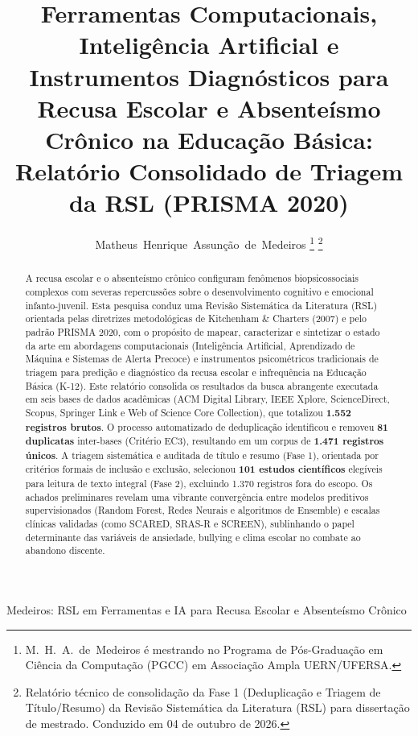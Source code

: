 \documentclass[journal,10pt,a4paper]{IEEEtran}
\begin{document}
\title{Ferramentas Computacionais, Inteligência Artificial e Instrumentos Diagnósticos para Recusa Escolar e Absenteísmo Crônico na Educação Básica: Relatório Consolidado de Triagem da RSL (PRISMA 2020)}

\author{Matheus~Henrique~Assunção~de~Medeiros%
\thanks{M.~H.~A.~de~Medeiros é mestrando no Programa de Pós-Graduação em Ciência da Computação (PGCC) em Associação Ampla UERN/UFERSA.}%
\thanks{Relatório técnico de consolidação da Fase 1 (Deduplicação e Triagem de Título/Resumo) da Revisão Sistemática da Literatura (RSL) para dissertação de mestrado. Conduzido em 04 de outubro de 2026.}
}

%
{Medeiros: RSL em Ferramentas e IA para Recusa Escolar e Absenteísmo Crônico}

\maketitle

\begin{abstract}
A recusa escolar e o absenteísmo crônico configuram fenômenos biopsicossociais complexos com severas repercussões sobre o desenvolvimento cognitivo e emocional infanto-juvenil. Esta pesquisa conduz uma Revisão Sistemática da Literatura (RSL) orientada pelas diretrizes metodológicas de Kitchenham \& Charters (2007) e pelo padrão PRISMA 2020, com o propósito de mapear, caracterizar e sintetizar o estado da arte em abordagens computacionais (Inteligência Artificial, Aprendizado de Máquina e Sistemas de Alerta Precoce) e instrumentos psicométricos tradicionais de triagem para predição e diagnóstico da recusa escolar e infrequência na Educação Básica (K-12). Este relatório consolida os resultados da busca abrangente executada em seis bases de dados acadêmicas (ACM Digital Library, IEEE Xplore, ScienceDirect, Scopus, Springer Link e Web of Science Core Collection), que totalizou \textbf{1.552 registros brutos}. O processo automatizado de deduplicação identificou e removeu \textbf{81 duplicatas} inter-bases (Critério EC3), resultando em um corpus de \textbf{1.471 registros únicos}. A triagem sistemática e auditada de título e resumo (Fase 1), orientada por critérios formais de inclusão e exclusão, selecionou \textbf{101 estudos científicos} elegíveis para leitura de texto integral (Fase 2), excluindo 1.370 registros fora do escopo. Os achados preliminares revelam uma vibrante convergência entre modelos preditivos supervisionados (Random Forest, Redes Neurais e algoritmos de Ensemble) e escalas clínicas validadas (como SCARED, SRAS-R e SCREEN), sublinhando o papel determinante das variáveis de ansiedade, bullying e clima escolar no combate ao abandono discente.
\end{abstract}
\end{document}
